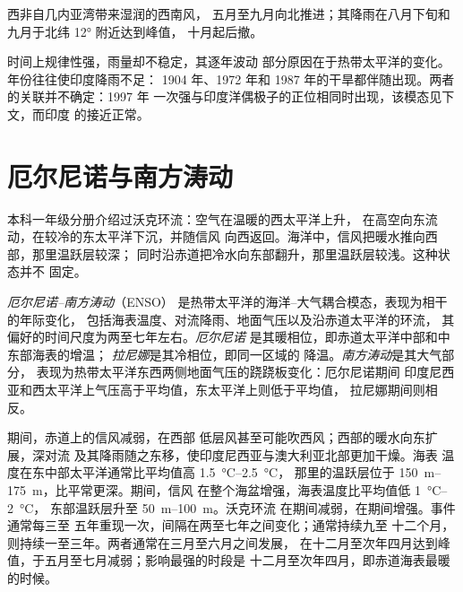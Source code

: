 西非自几内亚湾带来湿润的西南风，
五月至九月向北推进；其降雨在八月下旬和九月于北纬 \ang{12} 附近达到峰值，
十月起后撤。

时间上规律性强，雨量却不稳定，其逐年波动
部分原因在于热带太平洋的变化。年份往往使印度降雨不足：
1904 年、1972 年和 1987 年的干旱都伴随出现。两者的关联并不确定：1997 年
一次强与印度洋偶极子的正位相同时出现，该模态见下文，而印度
的接近正常。

\section{厄尔尼诺与南方涛动}\label{sec:b2:climate-variability:enso}

本科一年级分册介绍过沃克环流：空气在温暖的西太平洋上升，
在高空向东流动，在较冷的东太平洋下沉，并随信风
向西返回。海洋中，信风把暖水推向西部，那里温跃层较深；
同时沿赤道把冷水向东部翻升，那里温跃层较浅。这种状态并不
固定。

\begin{definition}\label{def:b2:climate-variability:enso}
\emph{厄尔尼诺–南方涛动}（ENSO）
是热带太平洋的海洋–大气耦合模态，表现为相干的年际变化，
包括海表温度、对流降雨、地面气压以及沿赤道太平洋的环流，
其偏好的时间尺度为两至七年左右。\emph{厄尔尼诺}
是其暖相位，即赤道太平洋中部和中东部海表的增温；
\emph{拉尼娜}是其冷相位，即同一区域的
降温。\emph{南方涛动}是其大气部分，
表现为热带太平洋东西两侧地面气压的跷跷板变化：厄尔尼诺期间
印度尼西亚和西太平洋上气压高于平均值，东太平洋上则低于平均值，
拉尼娜期间则相反。
\end{definition}

期间，赤道上的信风减弱，在西部
低层风甚至可能吹西风；西部的暖水向东扩展，深对流
及其降雨随之东移，使印度尼西亚与澳大利亚北部更加干燥。海表
温度在东中部太平洋通常比平均值高 \qtyrange{1.5}{2.5}{\celsius}，
那里的温跃层位于 \qtyrange{150}{175}{m}，比平常更深。期间，信风
在整个海盆增强，海表温度比平均值低 \qtyrange{1}{2}{\celsius}，
东部温跃层升至 \qtyrange{50}{100}{m}。沃克环流
在期间减弱，在期间增强。事件通常每三至
五年重现一次，间隔在两至七年之间变化；通常持续九至
十二个月，则持续一至三年。两者通常在三月至六月之间发展，
在十二月至次年四月达到峰值，于五月至七月减弱；影响最强的时段是
十二月至次年四月，即赤道海表最暖的时候。

